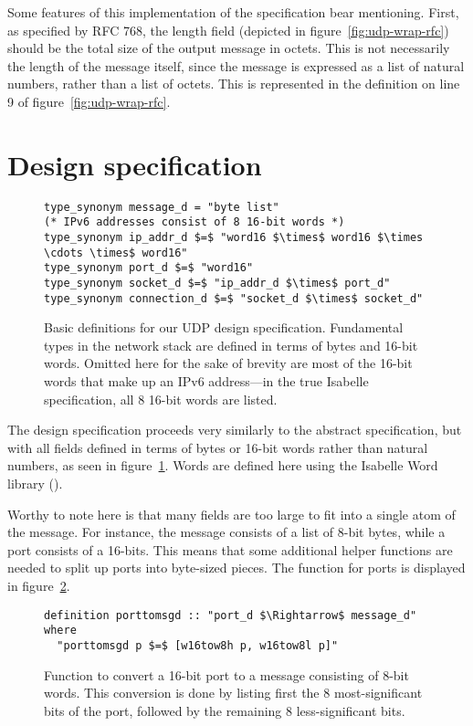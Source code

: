 \documentclass[twoside]{memoir}
\begin{document}
Some features of this implementation of the specification bear mentioning.
First, as specified by RFC 768, the length field (depicted in figure~\ref{fig:udp-wrap-rfc}) should be the total size of the output message in octets.
This is not necessarily the length of the message itself,
since the message is expressed as a list of natural numbers, rather than
a list of octets.
This is represented in the definition on line 9 of figure~\ref{fig:udp-wrap-rfc}.



\section{Design specification}

\begin{figure}[htpb]
    \centering
\begin{lstlisting}[language=isabelle]
type_synonym message_d = "byte list"
(* IPv6 addresses consist of 8 16-bit words *)
type_synonym ip_addr_d $=$ "word16 $\times$ word16 $\times \cdots \times$ word16"
type_synonym port_d $=$ "word16"
type_synonym socket_d $=$ "ip_addr_d $\times$ port_d"
type_synonym connection_d $=$ "socket_d $\times$ socket_d"
\end{lstlisting}
    \caption{Basic definitions for our UDP design specification.
    Fundamental types in the network stack are defined
    in terms of bytes and 16-bit words.
    Omitted here for the sake of brevity are most of the 16-bit words
    that make up an IPv6 address---in the true Isabelle specification,
    all 8 16-bit words are listed.}
    \label{fig:defs-design}
\end{figure}

The design specification proceeds very similarly to the abstract specification,
but with all fields defined in terms of bytes or 16-bit words rather than
natural numbers, as seen in figure~\ref{fig:defs-design}.
Words are defined here using the Isabelle Word library
(\cite{Word_Lib-AFP}).

Worthy to note here is that many fields are too large to fit into
a single atom of the message.
For instance, the message consists of a list of
8-bit bytes, while a port consists of a 16-bits.
This means that some additional helper functions are needed
to split up ports into byte-sized pieces.
The function for ports is displayed in figure~\ref{fig:porttomsg-design}.

\begin{figure}[htpb]
    \centering
\begin{lstlisting}[language=isabelle]
definition porttomsgd :: "port_d $\Rightarrow$ message_d" where
  "porttomsgd p $=$ [w16tow8h p, w16tow8l p]"
\end{lstlisting}
    \caption{Function to convert a 16-bit port to a message
        consisting of 8-bit words.
        This conversion is done by listing first the 8
        most-significant bits of the port, followed by
        the remaining 8 less-significant bits.}
    \label{fig:porttomsg-design}
\end{figure}
\end{document}

